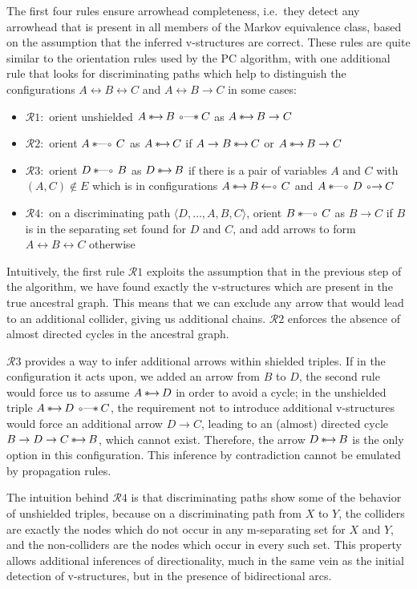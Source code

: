 The first four rules ensure arrowhead completeness, i.e.\ they detect any arrowhead that is present in all members of the Markov equivalence class, based on the assumption that the inferred v-structures are correct. These rules are quite similar to the orientation rules used by the PC algorithm, with one additional rule that looks for discriminating paths which help to distinguish the configurations $A \leftrightarrow B \leftrightarrow C$ and $A \leftrightarrow B \rightarrow C$ in some cases:
\begin{itemize}
 \item $\mathcal{R}1:$ orient unshielded $A \arrowSA B \arrowOS C$ as $A \arrowSA B \rightarrow C$
 \item $\mathcal{R}2:$ orient $A \arrowSO C$ as $A \arrowSA C$ if $A \rightarrow B \arrowSA C$ or $A \arrowSA B \rightarrow C$ 
 \item $\mathcal{R}3:$ orient $D \arrowSO B$ as $D \arrowSA B$ if there is a pair of variables $A$ and $C$ with $(A,C) \notin E$
 which is in configurations $A \arrowSA B \arrowAS C$ and $A \arrowSO D \arrowOA C$
 \item $\mathcal{R}4:$ on a discriminating path $\langle D, \dots, A,B,C \rangle$,
 orient $B \arrowSO C$ as $B \rightarrow C$ if $B$ is in the separating set found for $D$ and $C$,
 and add arrows to form $A \leftrightarrow B \leftrightarrow C$ otherwise
\end{itemize}
Intuitively, the first rule $\mathcal{R}1$ exploits the assumption that in the previous step of the algorithm, we have found exactly the v-structures which are present in the true ancestral graph. This means that we can exclude any arrow that would lead to an additional collider, giving us additional chains. $\mathcal{R}2$ enforces the absence of almost directed cycles in the ancestral graph.

$\mathcal{R}3$ provides a way to infer additional arrows within shielded triples. If in the configuration it acts upon, we added an arrow from $B$ to $D$, the second rule would force us to assume $A \arrowSA D$ in order to avoid a cycle; in the unshielded triple $A \arrowSA D \arrowOS C$, the requirement not to introduce additional v-structures would force an additional arrow $D \rightarrow C$, leading to an (almost) directed cycle $B \rightarrow D \rightarrow C \arrowSA B$, which cannot exist. Therefore, the arrow $D \arrowSA B$ is the only option in this configuration. This inference by contradiction cannot be 
emulated by propagation rules.

The intuition behind $\mathcal{R}4$ is that discriminating paths show some of the behavior of unshielded triples, because on a discriminating path from $X$ to $Y$, the colliders are exactly the nodes which do not occur in any m-separating set for $X$ and $Y$, and the non-colliders are the nodes which occur in every such set. This property allows additional inferences of directionality, much in the same vein as the initial detection of v-structures, but in the presence of bidirectional arcs.

